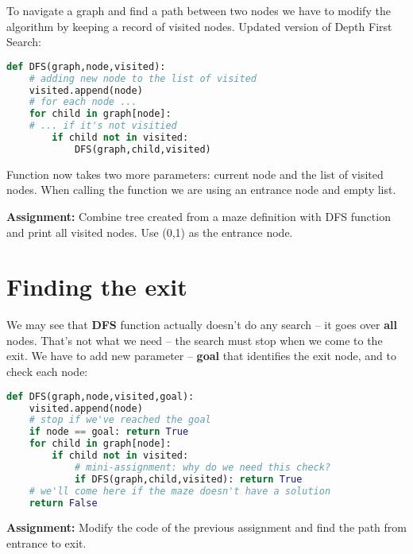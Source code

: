 To navigate a graph and find a path between two nodes we
have to modify the algorithm by keeping a record of visited
nodes. Updated version of Depth First Search:

\begin{lstlisting}[language=Python,style=codelst,caption={Python: DFS with saving visited nodes}]
def DFS(graph,node,visited):
    # adding new node to the list of visited
    visited.append(node)
    # for each node ...
    for child in graph[node]:
    # ... if it's not visitied
        if child not in visited:
            DFS(graph,child,visited)
\end{lstlisting}

Function now takes two more parameters: current node and the list
of visited nodes. When calling the function we are using
an entrance node and empty list.

\begin{tcolorbox}
\textbf{Assignment:}
Combine tree created from a maze definition with DFS function and
print all visited nodes. Use (0,1) as the entrance node.
\end{tcolorbox}

\section{Finding the exit}

We may see that \textbf{DFS} function actually doesn't do any search --
it goes over \textbf{all} nodes. That's not what we need -- the search must
stop when we come to the exit. We have to add new parameter -- \textbf{goal}
that identifies the exit node, and to check each node:

\begin{lstlisting}[language=Python,style=codelst,caption={Python: DFS with checking the goal}]
def DFS(graph,node,visited,goal):
    visited.append(node)
    # stop if we've reached the goal
    if node == goal: return True
    for child in graph[node]:
        if child not in visited:
            # mini-assignment: why do we need this check?
            if DFS(graph,child,visited): return True
    # we'll come here if the maze doesn't have a solution
    return False
\end{lstlisting}


\begin{tcolorbox}
\textbf{Assignment:}
Modify the code of the previous assignment and find the path from
entrance to exit.
\end{tcolorbox}


